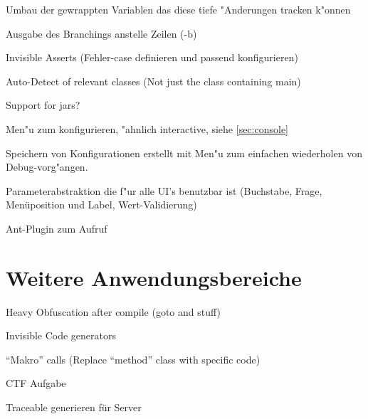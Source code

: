 Umbau der gewrappten Variablen das diese tiefe "Anderungen tracken k"onnen

Ausgabe des Branchings anstelle Zeilen (-b)

Invisible Asserts (Fehler-case definieren und passend konfigurieren)

Auto-Detect of relevant classes (Not just the class containing main)

Support for jars?

Men"u zum konfigurieren, "ahnlich interactive, siehe \ref{sec:console}

Speichern von Konfigurationen erstellt mit Men"u zum einfachen wiederholen von Debug-vorg"angen.

Parameterabstraktion die f"ur alle UI's benutzbar ist (Buchstabe, Frage, Menüposition und Label, Wert-Validierung)

Ant-Plugin zum Aufruf

\section{Weitere Anwendungsbereiche} 

Heavy Obfuscation after compile (goto and stuff)

Invisible Code generators

"`Makro"' calls (Replace "`method"' class with specific code)

CTF Aufgabe

Traceable generieren für Server